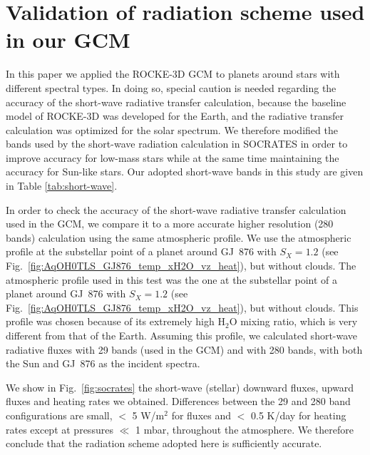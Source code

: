 \documentclass[11pt,numberedappendix,twocolappendix,]{emulateapj}
\def\water{H$_2$O }
\newcommand{\dsa}[1]{{\color{blue}#1}}
\begin{document}
\section{Validation of radiation scheme used in our GCM}
\label{ap:radiation}

In this paper we applied \dsa{the ROCKE-3D GCM} to planets \dsa{around stars} with different spectral types. 
In doing so, special caution \dsa{is needed regarding} the accuracy of the \dsa{short-wave} radiative transfer calculation, because the baseline model of ROCKE-3D \dsa{was} developed for the Earth, and the radiative transfer calculation was optimized for \dsa{the} solar spectrum. 
\dsa{We therefore modified the bands used by the short-wave radiation calculation in SOCRATES in order to improve accuracy for low-mass stars while at the same time maintaining the accuracy for Sun-like stars.
Our adopted short-wave bands in this study are given in Table \ref{tab:short-wave}.}

In order to check the accuracy of the \dsa{short-wave} radiative transfer calculation used in the GCM, we compare it \dsa{to} a more accurate \dsa{higher resolution (280 bands)} calculation \dsa{using} the \dsa{same atmospheric} profile. 
\dsa{We use the atmospheric profile at the \dsa{substellar} point of a planet around GJ~876 with $S_X=1.2$ (see Fig.~\ref{fig:AqOH0TLS_GJ876_temp_xH2O_vz_heat}), but without clouds.}
The atmospheric profile used in this test was the one at the \dsa{substellar} point of a planet around GJ~876 with $S_X=1.2$ (see Fig.~\ref{fig:AqOH0TLS_GJ876_temp_xH2O_vz_heat}), but without clouds. 
This profile was chosen because of its extremely high \water mixing ratio, which is very different from \dsa{that of} the Earth. 
Assuming \dsa{this} profile, we calculated short-wave radiative \dsa{fluxes} with 29 bands (used in the GCM) and with 280 bands, \dsa{with both the Sun and GJ~876 as the incident spectra}.

We show in Fig.~\ref{fig:socrates} the short-wave (stellar) downward fluxes, upward fluxes and heating rates \dsa{we obtained}.
Differences \dsa{between the 29 and 280 band configurations} are small, $<$ 5 W/m$^2$ for fluxes and $<$ 0.5 K/day for \dsa{heating rates} except at pressures $\ll$ 1 mbar, throughout the atmosphere. We therefore conclude that the radiation scheme adopted here is sufficiently accurate.
\end{document}
